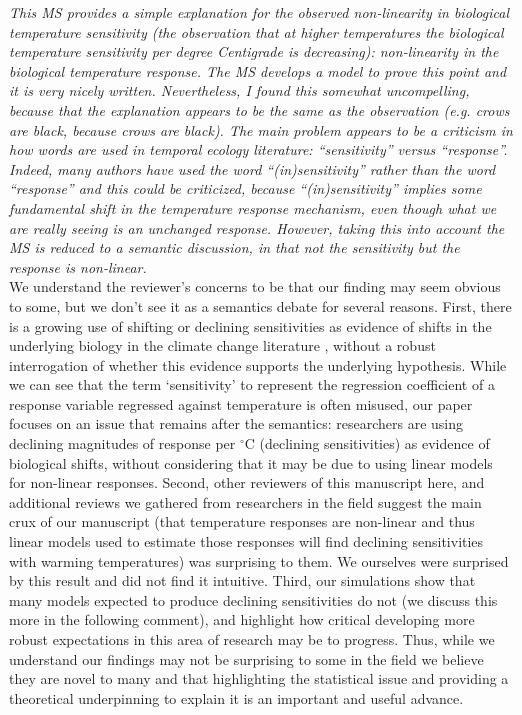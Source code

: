 \documentclass[11pt]{article}
\begin{document}
\emph{This MS provides a simple explanation for the observed non-linearity in biological temperature sensitivity (the observation that at higher temperatures the biological temperature sensitivity per degree Centigrade is decreasing): non-linearity in the biological temperature response. The MS develops a model to prove this point and it is very nicely written. Nevertheless, I found this somewhat uncompelling, because that the explanation appears to be the same as the observation (e.g. crows are black, because crows are black). The main problem appears to be a criticism in how words are used in temporal ecology literature: ``sensitivity'' versus ``response''. Indeed, many authors have used the word ``(in)sensitivity'' rather than the word ``response'' and this could be criticized, because ``(in)sensitivity'' implies some fundamental shift in the temperature response mechanism, even though what we are really seeing is an unchanged response. However, taking this into account the MS is reduced to a semantic discussion, in that not the sensitivity but the response is non-linear.}\\

We understand the reviewer's concerns to be that our finding may seem obvious to some, but we don't see it as a semantics debate for several reasons. First, there is a growing use of shifting or declining sensitivities as evidence of shifts in the underlying biology in the climate change literature \citep[e.g.,][]{fu2015,piao2017}, without a robust interrogation of whether this evidence supports the underlying hypothesis. While we can see that the term `sensitivity' to represent the regression coefficient of a response variable regressed against temperature is often misused, our paper focuses on an issue that remains after the semantics: researchers are using declining magnitudes of response per $^{\circ}$C (declining sensitivities) as evidence of biological shifts, without considering that it may be due to using linear models for non-linear responses. Second, other reviewers of this manuscript here, and additional reviews we gathered from researchers in the field suggest the main crux of our manuscript (that temperature responses are non-linear and thus linear models used to estimate those responses will find declining sensitivities with warming temperatures) was surprising to them. We ourselves were surprised by this result and did not find it intuitive. Third, our simulations show that many models expected to produce declining sensitivities do not (we discuss this more in the following comment), and highlight how critical developing more robust expectations in this area of research may be to progress. Thus, while we understand our findings may not be surprising to some in the field we believe they are novel to many and that highlighting the statistical issue and providing a theoretical underpinning to explain it is an important and useful advance.\\
\end{document}
